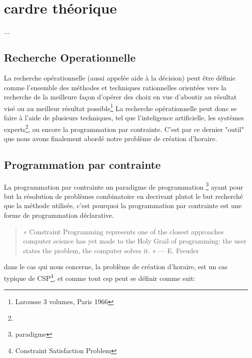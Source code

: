 \section{cardre théorique}
...
\subsection{Recherche Operationnelle}
La recherche opérationnelle (aussi appelée aide à la décision) peut être définie comme l'ensemble des méthodes et techniques rationnelles orientées vers la recherche de la meilleure façon d'opérer des choix en vue d'aboutir au résultat visé ou au meilleur résultat possible\footnote{Larousse 3 volumes, Paris 1966}
La recherche opérationnelle peut donc se faire à l'aide de plusieurs techniques, tel que l'inteligence artificielle, les systèmes experts\footnote{}, ou encore la programmation par contrainte.  C'est par ce dernier "outil" que nous avons finalement abordé notre problème de création d'horaire.
\subsection{Programmation par contrainte}

La programmation par contrainte un paradigme de programmation \footnote{paradigme} ayant pour but la résolution de problèmes combinatoire en
 decrivant plutot le but recherché que la méthode utilisée, c'est pourquoi la programmation par contrainte est une forme de programmation déclarative.
\begin{quote}
« Constraint Programming represents one of the closest approaches computer science has yet made to the Holy Grail of programming: the user states the problem, the computer solves it. »
— E. Freuder
\end{quote}

dans le cas qui nous concerne, la problème de création d'horaire, est un cas typique de CSP\footnote{Constraint Satisfaction Problem}, et comme tout csp peut se définir comme suit:
   



